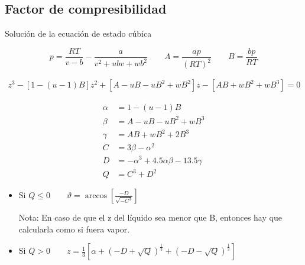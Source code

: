 \subsection{Factor de compresibilidad}

Solución de la ecuación de estado cúbica

\begin{equation}
p=\frac{RT}{v-b} - \frac{a}{v^2 + ubv+ wb^2}
\qquad
A=\frac{ap}{(RT)^2}
\qquad
B=\frac{bp}{RT}
\end{equation}

\begin{eqnarray}
z^3-\left[1-(u-1)B\right]z^2+ \left[A-uB-uB^2 + wB^2\right]z-\left[AB+wB^2+wB^3\right]=0
\end{eqnarray}


\begin{align}
\alpha &= 1-(u-1)B\\
\beta &= A -uB-uB^2+wB^3\\
\gamma &= AB +wB^2+ 2B^3\\
C &= 3\beta - \alpha^2\\
D&= - \alpha^3+ 4.5 \alpha \beta -13.5 \gamma\\
Q&=C^3+D^2
\end{align}


\begin{itemize}
\item Si $Q \leq 0 \qquad \vartheta = \arccos \left[\frac{-D}{\sqrt{-C^3}}\right]$
Nota: En caso de que el z del líquido sea menor que B, entonces hay que calcularla como si fuera vapor.
\item Si $Q > 0 \qquad z = \frac{1}{3}\left[\alpha + \left(-D + \sqrt{Q}\right)^{\frac{1}{3}}+ \left(-D - \sqrt{Q}\right)^{\frac{1}{3}} \right]$
\end{itemize}